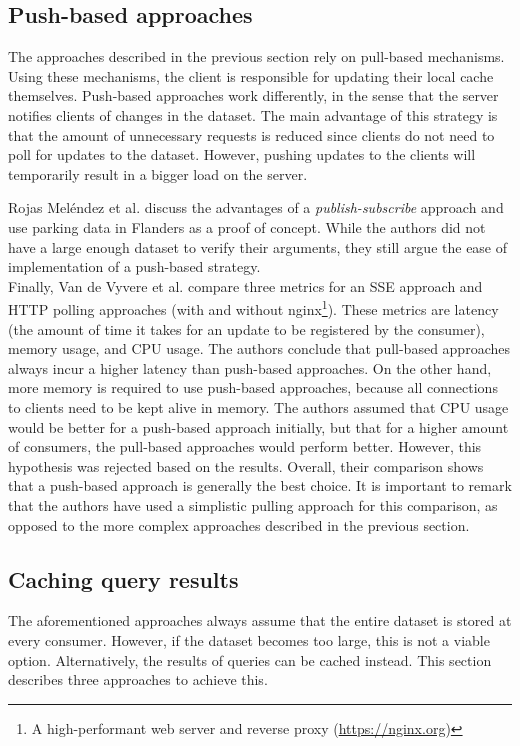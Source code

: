 \subsection{Push-based approaches}
The approaches described in the previous section rely on pull-based mechanisms. Using these mechanisms, the client is responsible for updating their local cache themselves. Push-based approaches work differently, in the sense that the server notifies clients of changes in the dataset. The main advantage of this strategy is that the amount of unnecessary requests is reduced since clients do not need to poll for updates to the dataset. However, pushing updates to the clients will temporarily result in a bigger load on the server.\\

\clearpage

\noindent Rojas Meléndez et al. \cite{10.1145/3184558.3191650} discuss the advantages of a \emph{publish-subscribe} approach and use parking data in Flanders as a proof of concept. While the authors did not have a large enough dataset to verify their arguments, they still argue the ease of implementation of a push-based strategy.\\

\noindent Finally, Van de Vyvere et al. \cite{van2020comparing} compare three metrics for an SSE approach and HTTP polling approaches (with and without nginx\footnote{A high-performant web server and reverse proxy (\url{https://nginx.org})}). These metrics are latency (the amount of time it takes for an update to be registered by the consumer), memory usage, and CPU usage. The authors conclude that pull-based approaches always incur a higher latency than push-based approaches. On the other hand, more memory is required to use push-based approaches, because all connections to clients need to be kept alive in memory. The authors assumed that CPU usage would be better for a push-based approach initially, but that for a higher amount of consumers, the pull-based approaches would perform better. However, this hypothesis was rejected based on the results. Overall, their comparison shows that a push-based approach is generally the best choice. It is important to remark that the authors have used a simplistic pulling approach for this comparison, as opposed to the more complex approaches described in the previous section.

\subsection{Caching query results}
The aforementioned approaches always assume that the entire dataset is stored at every consumer. However, if the dataset becomes too large, this is not a viable option. Alternatively, the results of queries can be cached instead. This section describes three approaches to achieve this.\\

